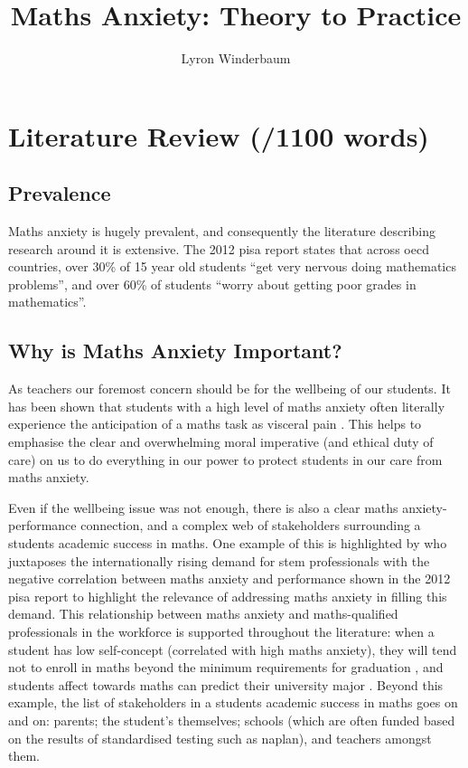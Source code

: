 \documentclass[14pt]{memoir}
\title{Maths Anxiety: Theory to Practice}
\author{Lyron Winderbaum}
\begin{document}
\maketitle



\begin{abstract}

\lipsum[1-2]

\end{abstract}


\glsresetall
\section{Literature Review (/1100 words)}

\subsection*{Prevalence}

Maths anxiety is hugely prevalent, and consequently the literature describing research around it is extensive. The  2012 \gls{pisa} report states that across \gls{oecd} countries, over 30\% of 15 year old students ``get very nervous doing mathematics problems'', and over 60\% of students ``worry about getting poor grades in mathematics''. 

\subsection*{Why is Maths Anxiety Important?}

As teachers our foremost concern should be for the wellbeing of our students. It has been shown that students with a high level of maths anxiety often literally experience the anticipation of a maths task as visceral pain \cite{Lyons2012pain}. This helps to emphasise the clear and overwhelming moral imperative (and ethical duty of care) on us to do everything in our power to protect students in our care from maths anxiety.

Even if the wellbeing issue was not enough, there is also a clear maths anxiety-performance connection, and a complex web of stakeholders surrounding a students academic success in maths. One example of this is highlighted by  who juxtaposes the internationally rising demand for \gls{stem} professionals with the negative correlation between maths anxiety and performance shown in the 2012 \gls{pisa} \cite{PISA2013} report to highlight the relevance of addressing maths anxiety in filling this demand. This relationship between maths anxiety and maths-qualified professionals in the workforce is supported throughout the literature: when a student has low self-concept (correlated with high maths anxiety), they will tend not to enroll in maths beyond the minimum requirements for graduation \cite{Ashcraft2007book}, and students affect towards maths can predict their university major \cite{LeFevre1992}. Beyond this example, the list of stakeholders in a students academic success in maths goes on and on: parents; the student's themselves; schools (which are often funded based on the results of standardised testing such as \gls{naplan}), and teachers amongst them. 
\end{document}
